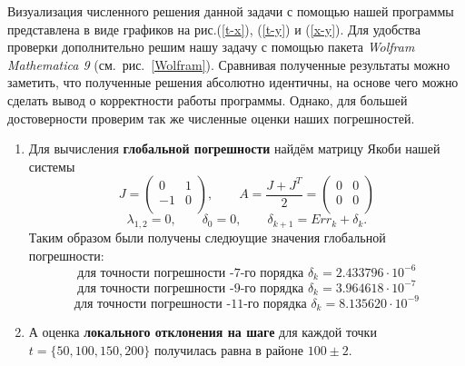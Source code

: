 \documentclass[a4paper,14pt]{article}
\begin{document}
Визуализация численного решения данной задачи с помощью нашей программы представлена в виде графиков на рис.(\ref{t-x}), (\ref{t-y}) и (\ref{x-y}). Для удобства проверки дополнительно решим нашу задачу с помощью пакета {\it Wolfram Mathematica 9} (см.~рис.~\ref{Wolfram}).
Сравнивая полученные результаты можно заметить, что полученные решения абсолютно идентичны, на основе чего можно сделать вывод о корректности работы программы. Однако, для большей достоверности проверим так же численные оценки наших погрешностей.\\
\begin{enumerate}
\item Для вычисления {\bf глобальной погрешности} найдём матрицу Якоби нашей системы
\[
J = \left(
\begin{array}{cc}
 0 & 1 \\
 -1 & 0 \\
\end{array}
\right),
\qquad
A = \frac{J + J^T}{2} =
\left(
\begin{array}{cc}
 0 & 0 \\
 0 & 0 \\
\end{array}
\right)
\]
\[
\lambda_{1,2} = 0, \qquad \delta_0 = 0, \qquad \delta_{k+1} = Err_{k} + \delta_{k}.
\]
Таким образом были получены следюущие значения глобальной погрешности:
\[
\text{для точности погрешности -7-го порядка } \delta_k =  2.433796 \cdot 10^{-6}
\]
\[
\text{для точности погрешности -9-го порядка } \delta_k =  3.964618 \cdot 10^{-7}
\]
\[
\text{для точности погрешности -11-го порядка } \delta_k =  8.135620 \cdot 10^{-9}
\]

\item А оценка {\bf локального отклонения на шаге} для каждой точки $t = \{50, 100, 150, 200\}$ получилась равна в районе $100 \pm 2$.
\end{enumerate}
\end{document}
